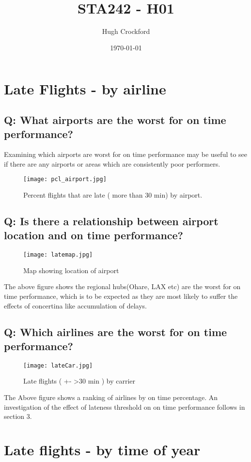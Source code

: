 \documentclass[12pt]{article}
\title{STA242 - H01}
\author{Hugh Crockford}
\date{\today}
\begin{document}
	\maketitle
	\tableofcontents
	\clearpage
	\section{Late Flights - by airline }
	\subsection{Q: What airports are the worst for on time performance?}
		Examining which airports are worst for on time performance may be useful to see if there are any airports or areas which are consistently poor performers.
		\begin{figure}[h!b]
			\centering
			\texttt{[image: pcl\_airport.jpg]}
			\caption{Percent flights that are late ( more than 30 min) by airport. }
		\end{figure}
	\newpage
	\subsection{Q: Is there a relationship between airport location and on time performance?}
		\begin{figure}[h!]
			\centering
			\texttt{[image: latemap.jpg]}
			\caption{Map showing location of airport}
		\end{figure}
		The above figure shows the regional hubs(Ohare, LAX etc)  are the worst for on time performance, which is to be expected as they are most likely to suffer the effects of concertina like accumulation of delays.
	\newpage
	\subsection{Q: Which airlines are the worst for on time performance?}
	\begin{figure}[h!]
		\centering
		\texttt{[image: lateCar.jpg]}
		\caption{Late flights ( +- >30 min ) by carrier}
	\end{figure}
	The Above figure shows a ranking of airlines by on time percentage.
	An investigation of the effect of lateness threshold on on time performance follows in section 3.
	\newpage 
	\section{Late flights - by time of year}
\end{document}
